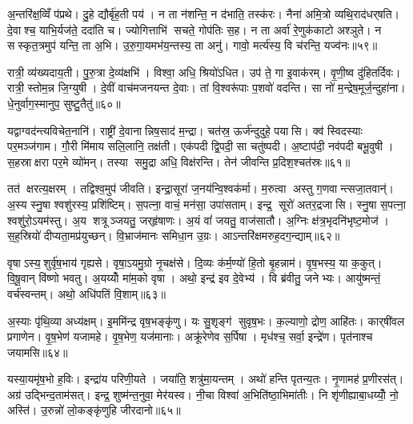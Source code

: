 अ॒न्तरि॑क्ष॒व्विँ प॑प्रथे। दु॒हे द्यौर्बृ॑ह॒ती पय॑। न ता न॑शन्ति॒ न द॑भाति॒ तस्क॑रः। नैना॑ अमि॒त्रो व्यथि॒राद॑धर्‌षति। दे॒वाश्च॒ याभि॒र्यज॑ते॒ ददा॑ति च। ज्योगित्ताभि॑ सचते॒ गोप॑तिः स॒ह। न ता अर्वा॑ रे॒णुक॑काटो अश्ञुते। न सस्कृत॒त्रमुप॑ यन्ति॒ ता अ॒भि। उ॒रु॒गा॒यमभ॑य॒न्तस्य॒ ता अनु॑। गावो॒ मर्त्य॑स्य॒ वि च॑रन्ति॒ यज्व॑नः॥५९॥

रात्री॒ व्य॑ख्यदाय॒ती। पु॒रु॒त्रा दे॒व्य॑क्षभि॑। विश्वा॒ अधि॒ श्रियो॑ऽधित। उप॑ ते॒ गा इ॒वाक॑रम्। वृ॒णी॒ष्व दु॑हितर्दिवः। रात्री॒ स्तोम॒न्न जि॒ग्युषी। दे॒वीं वाच॑मजनयन्त दे॒वाः। तां वि॒श्वरू॑पाः प॒शवो॑ वदन्ति। सा नो॑ म॒न्द्रेष॒मूर्ज॒न्दुहा॑ना। धे॒नुर्वाग॒स्मानुप॒ सुष्टु॒तैतु॑॥६०॥

यद्वाग्वद॑न्त्यविचेत॒नानि॑। राष्ट्री॑ दे॒वानान्निष॒साद॑ म॒न्द्रा। चत॑स्र॒ ऊर्ज॑न्दुदुहे॒ पयासि। क्व॑ स्विदस्याः पर॒मञ्ज॑गाम। गौ॒री मि॑माय सलि॒लानि॒ तक्ष॑ती। एक॑पदी द्वि॒पदी॒ सा चतु॑ष्पदी। अ॒ष्टाप॑दी॒ नव॑पदी बभू॒वुषी। स॒हस्राक्षरा पर॒मे व्यो॑मन्। तस्या समु॒द्रा अधि॒ विक्ष॑रन्ति। तेन॑ जीवन्ति प्र॒दिश॒श्चत॑स्रः॥६१॥

तत॑ क्षरत्य॒क्षरम्। तद्विश्व॒मुप॑ जीवति। इन्द्रा॒सूरा॑ ज॒नय॑न्वि॒श्वक॑र्मा। म॒रुत्वा अस्तु ग॒णवान्त्सजा॒तवान्॑। अ॒स्य स्नु॒षा श्वशु॑रस्य॒ प्रशि॑ष्टिम्। स॒पत्ना॒ वाचं॒ मन॑सा॒ उपा॑सताम्। इन्द्र॒ सूरो॑ अतर॒द्रजासि। स्नु॒षा स॒पत्ना॒ श्वशु॑रो॒ऽयम॑स्तु। अ॒य शत्रूञ्जयतु॒ जर्‌हृ॑षाणः। अ॒यं वां॑ जयतु॒ वाज॑सातौ। अ॒ग्निः क्ष॑त्र॒भृदनि॑भृष्ट॒मोज॑। स॒ह॒स्रियो॑ दीप्यता॒मप्र॑युच्छन्। वि॒भ्राज॑मानः समिधा॒न उ॒ग्रः। आऽन्तरि॑क्षमरुह॒दग॒न्द्याम्॥६२॥\anuvakamend[धा॒रय॑न्पुरो॒डाशं॒ बृह॒स्पतिं॑ ज॒घन॑च्युतिमान॒न्दो भग॑स्य तृप्याण्य॒ग्नेः पृ॑थि॒वी यज्व॑न एतु प्र॒दिश॒श्चत॑स्रो॒ वाज॑सातौ च॒त्वारि॑ च]

वृषाऽस्य॒शुर्वृ॑ष॒भाय॑ गृह्यसे। वृषा॒ऽयमु॒ग्रो नृ॒चक्ष॑से। दि॒व्यः क॑र्म॒ण्यो॑ हि॒तो बृ॒हन्नाम॑। वृ॒ष॒भस्य॒ या क॒कुत्। वि॒षू॒वान् वि॑ष्णो भवतु। अ॒यय्योँ मा॑म॒को वृषा। अथो॒ इन्द्र॑ इव दे॒वेभ्य॑। वि ब्र॑वीतु॒ जनेभ्यः। आयु॑ष्मन्तं॒ वर्च॑स्वन्तम्। अथो॒ अधि॑पतिं वि॒शाम्॥६३॥

अ॒स्याः पृ॑थि॒व्या अध्य॑क्षम्। इ॒ममि॑न्द्र वृष॒भङ्कृ॑णु। यः सु॒शृङ्ग॑ सुवृष॒भः। क॒ल्याणो॒ द्रोण॒ आहि॑तः। कार्‌षी॑वल प्रगाणेन। वृ॒ष॒भेण॑ यजामहे। वृ॒ष॒भेण॒ यज॑मानाः। अक्रू॑रेणेव स॒र्पिषा। मृध॑श्च॒ सर्वा॒ इन्द्रे॑ण। पृत॑नाश्च जयामसि॥६४॥

यस्या॒यमृ॑ष॒भो ह॒विः। इन्द्रा॑य परिणी॒यते। जया॑ति॒ शत्रु॑मा॒यन्तम्। अथो॑ हन्ति पृतन्य॒तः। नृ॒णामह॑ प्र॒णीरस॑त्। अग्र॑ उद्भिन्द॒ताम॑सत्। इन्द्र॒ शुष्म॑न्त॒नुवा॒ मेर॑यस्व। नी॒चा विश्वा॑ अ॒भिति॑ष्ठा॒भिमा॑तीः। नि शृ॑णीह्याबा॒धय्योँ॒ नो॒ अस्ति॑। उ॒रुन्नो॑ लो॒कङ्कृ॑णुहि जीरदानो॥६५॥

